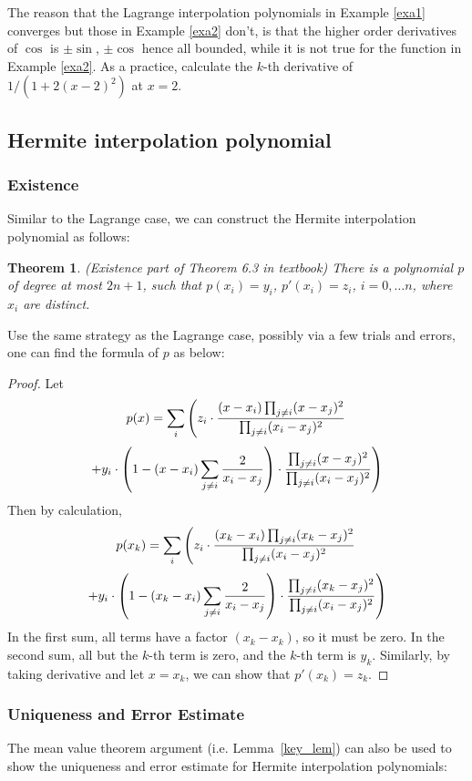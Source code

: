 \documentclass{article} %
\theoremstyle{break}
\newtheorem{thm}[definition]{Theorem}
\begin{document}
The reason that the Lagrange interpolation polynomials in Example \ref{exa1} converges but those in Example \ref{exa2} don't, is that the higher order derivatives of $\cos$ is $\pm \sin$, $\pm \cos$ hence all bounded, while it is not true for the function in Example \ref{exa2}. As a practice, calculate the $k$-th derivative of $1/(1+2(x-2)^2)$ at $x=2$.


\subsection{Hermite interpolation polynomial}

\subsubsection{Existence}

Similar to the Lagrange case, we can construct the Hermite interpolation polynomial as follows:
\begin{thm}\label{ext_her} (Existence part of Theorem 6.3 in textbook) There is a polynomial $p$ of degree at most $2n+1$, such that $p(x_i)=y_i$, $p'(x_i)=z_i$, $i=0, \dots n$, where $x_i$ are distinct.
\end{thm}
Use the same strategy as the Lagrange case, possibly via a few trials and errors, one can find the formula of $p$ as below:
\begin{proof}
  Let
  \[p(x)=\sum_i\left( z_i\cdot {(x-x_i)\prod_{j\not=i}(x-x_j)^2\over \prod_{j\not=i}(x_i-x_j)^2}\right. \]
  \[\left. +y_i\cdot \left(1-(x-x_i)\sum_{j\not=i}{2\over x_i-x_j}\right)\cdot {\prod_{j\not=i}(x-x_j)^2\over \prod_{j\not=i}(x_i-x_j)^2} \right)\]
  Then by calculation,
  \[p(x_k)=\sum_i\left( z_i\cdot {(x_k-x_i)\prod_{j\not=i}(x_k-x_j)^2\over \prod_{j\not=i}(x_i-x_j)^2}\right. \]
  \[\left. +y_i\cdot \left(1-(x_k-x_i)\sum_{j\not=i}{2\over x_i-x_j}\right)\cdot {\prod_{j\not=i}(x_k-x_j)^2\over \prod_{j\not=i}(x_i-x_j)^2} \right)\]
  In the first sum, all terms have a factor $(x_k-x_k)$, so it must be zero. In the second sum, all but the $k$-th term is zero, and the $k$-th term is $y_k$.
  Similarly, by taking derivative and let $x=x_k$, we can show that $p'(x_k)=z_k$.
  \end{proof}

  
\subsubsection{Uniqueness and Error Estimate}
  
  The mean value theorem argument (i.e. Lemma~\ref{key_lem}) can also be used to show the uniqueness and error estimate for Hermite interpolation polynomials:
\end{document}

